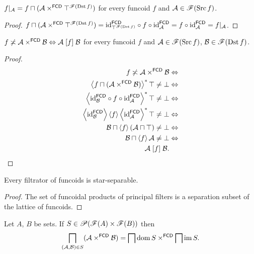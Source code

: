 \begin{cor}
$f|_{\mathcal{A}}=f\sqcap(\mathcal{A}\times^{\mathsf{FCD}}\top^{\mathscr{F}(\operatorname{Dst}
f)})$
for every funcoid $f$ and $\mathcal{A}\in\mathscr{F}(\operatorname{Src} f)$.\end{cor}
\begin{proof}
$f\sqcap(\mathcal{A}\times^{\mathsf{FCD}}\top^{\mathscr{F}(\operatorname{Dst}
f)})={\operatorname{id}}_{\top^{\mathscr{F}(\operatorname{Dst} f)}}^{\mathsf{FCD}}\circ
f\circ{\operatorname{id}}_{\mathcal{A}}^{\mathsf{FCD}}=f\circ{\operatorname{id}}_{\mathcal{A}}^{\mathsf{FCD}}
=f|_{\mathcal{A}}$.\end{proof}
\begin{cor}
$f\not\asymp\mathcal{A}\times^{\mathsf{FCD}}\mathcal{B}\Leftrightarrow\mathcal{A}
\mathrel{\left[f\right]}\mathcal{B}$
for every funcoid $f$ and $\mathcal{A}\in\mathscr{F}(\operatorname{Src} f)$,
$\mathcal{B}\in\mathscr{F}(\operatorname{Dst} f)$.\end{cor}
\begin{proof}
~
\begin{align*}
f\not\asymp\mathcal{A}\times^{\mathsf{FCD}}\mathcal{B} & \Leftrightarrow\\
\left\langle f\sqcap(\mathcal{A}\times^{\mathsf{FCD}}\mathcal{B})\right\rangle ^{\ast}\top\ne\bot & \Leftrightarrow\\
\left\langle {\operatorname{id}}_{\mathcal{B}}^{\mathsf{FCD}}\circ
f\circ{\operatorname{id}}_{\mathcal{A}}^{\mathsf{FCD}}\right\rangle ^{\ast}\top\ne\bot & \Leftrightarrow\\
\left\langle {\operatorname{id}}_{\mathcal{B}}^{\mathsf{FCD}}\right\rangle\left\langle f\right\rangle\left\langle {\operatorname{id}}_{\mathcal{A}}^{\mathsf{FCD}}\right\rangle ^{\ast}\top\ne\bot & \Leftrightarrow\\
\mathcal{B}\sqcap\left\langle f\right\rangle(\mathcal{A}\sqcap\top)\ne\bot & \Leftrightarrow\\
\mathcal{B}\sqcap\left\langle f\right\rangle\mathcal{A}\ne\bot &
\Leftrightarrow\\
\mathcal{A}\mathrel{\left[f\right]}\mathcal{B}.
\end{align*}
\end{proof}
\begin{cor}
Every filtrator of funcoids is star-separable.\end{cor}
\begin{proof}
The set of funcoidal products of principal filters is a separation
subset of the lattice of funcoids.\end{proof}
\begin{thm}
\label{meet-prod-fcd}Let $A$, $B$ be sets. If
$S\in\mathscr{P}(\mathscr{F}(A)\times\mathscr{F}(B))$
then
\[
\bigsqcap_{(\mathcal{A},\mathcal{B})\in
S}(\mathcal{A}\times^{\mathsf{FCD}}\mathcal{B})=\bigsqcap\operatorname{dom}
S\times^{\mathsf{FCD}}\bigsqcap\operatorname{im} S.
\]
\end{thm}
